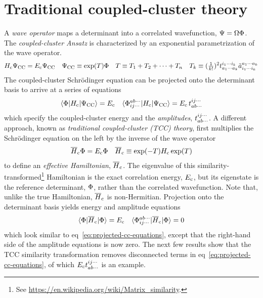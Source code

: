 \documentclass[11pt]{article}
\numberwithin{equation}{section}
\begin{document}
\setlength{\abovedisplayskip}{3pt}
\setlength{\belowdisplayskip}{3pt}

\setcounter{section}{4}
\section{Traditional coupled-cluster theory}

\begin{dfn}\label{dfn:cc-effective-hamiltonian}
A \textit{wave operator} maps a determinant into a correlated wavefunction, $\Psi =\Omega \Phi $.
The \textit{coupled-cluster Ansatz} is characterized by an exponential parametrization of the wave operator.
\begin{align}
\label{eq:cc-effective-hamiltonian}
  H_{\mathrm{c}}\Psi _{\mathrm{CC}}
=
  E_{\mathrm{c}}\Psi _{\mathrm{CC}}
&&
  \Psi _{\mathrm{CC}}
\equiv
  \mathrm{exp}(T)
  \Phi 
&&
  T
\equiv
  T_1
+
  T_2
+
  \cdots
+
  T_n
&&
  T_k
\equiv
  (\tfrac{1}{k!})^2
  t_{a_1\cdots a_k}^{i_1\cdots i_k}
  \tilde{a}^{a_1\cdots a_k}_{i_1\cdots i_k}
\end{align}
The coupled-cluster Schr\"odinger equation can be projected onto the determinant basis to arrive at a series of equations
\begin{align}
\label{eq:projected-cc-equations}
  \langle\Phi |H_{\mathrm{c}}|\Psi _{\mathrm{CC}}\rangle
=
  E_{\mathrm{c}}
&&
  \langle\Phi _{ij\cdots}^{ab\cdots}|H_{\mathrm{c}}|\Psi _{\mathrm{CC}}\rangle
=
  E_{\mathrm{c}}\,t_{ab\cdots}^{ij\cdots}
\end{align}
which specify the coupled-cluster energy and the \textit{amplitudes}, $t_{ab\cdots}^{ij\cdots}$.
A different approach, known as \textit{traditional coupled-cluster (TCC) theory}, first multiplies the Schr\"odinger equation on the left by the inverse of the wave operator
\begin{align}
  \overline{H}_{\mathrm{c}}
  \Phi 
=
  E_{\mathrm{c}}
  \Phi 
&&
  \overline{H}_{\mathrm{c}}
\equiv
  \mathrm{exp}(-T)
  H_{\mathrm{c}}\,
  \mathrm{exp}(T)
\end{align}
to define an \textit{effective Hamiltonian}, $\overline{H}_{\mathrm{c}}$.
The eigenvalue of this similarity-transformed\footnote{See \url{https://en.wikipedia.org/wiki/Matrix_similarity}.} Hamiltonian is the exact correlation energy, $E_{\mathrm{c}}$, but its eigenstate is the reference determinant, $\Phi $, rather than the correlated wavefunction.
Note that, unlike the true Hamiltonian, $\overline{H}_{\mathrm{c}}$ is non-Hermitian.
Projection onto the determinant basis yields energy and amplitude equations
\begin{align}
\label{eq:traditional-cc-equations}
  \langle\Phi |\overline{H}_{\mathrm{c}}|\Phi \rangle
=
  E_{\mathrm{c}}
&&
  \langle\Phi _{ij\cdots}^{ab\cdots}|\overline{H}_{\mathrm{c}}|\Phi \rangle
=
  0
\end{align}
which look similar to eq~\ref{eq:projected-cc-equations}, except that the right-hand side of the amplitude equations is now zero.
The next few results show that the TCC similarity transformation removes disconnected terms in eq~\ref{eq:projected-cc-equations}, of which $E_{\mathrm{c}}t_{ab\cdots}^{ij\cdots}$ is an example.
\end{dfn}
\end{document}
